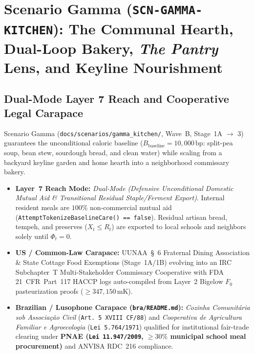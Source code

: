 \chapter{Scenario Gamma (\texttt{SCN-GAMMA-KITCHEN}): The Communal Hearth, Dual-Loop Bakery, \textit{The Pantry} Lens, and Keyline Nourishment}
\label{app:scenario-gamma}

\section{Dual-Mode Layer 7 Reach and Cooperative Legal Carapace}
Scenario Gamma (\texttt{docs/scenarios/gamma\_kitchen/}, Wave~B, Stage~1A $\to$ 3) guarantees the unconditional caloric baseline ($B_{\mathrm{baseline}} = 10{,}000\,\mathrm{bp}$: split-pea soup, bean stew, sourdough bread, and clean water) while scaling from a backyard keyline garden and home hearth into a neighborhood commissary bakery.
\begin{itemize}
    \item \textbf{Layer~7 Reach Mode:} \textit{Dual-Mode (Defensive Unconditional Domestic Mutual Aid \& Transitional Residual Staple/Ferment Export)}. Internal resident meals are $100\%$ non-commercial mutual aid (\texttt{AttemptTokenizeBaselineCare() == false}). Residual artisan bread, tempeh, and preserves ($X_t \le R_t$) are exported to local schools and neighbors solely until $\Phi_t = 0$.
    \item \textbf{US / Common-Law Carapace:} UUNAA~\S~6 Fraternal Dining Association \& State Cottage Food Exemptions (Stage~1A/1B) evolving into an IRC Subchapter~T Multi-Stakeholder Commissary Cooperative with FDA 21~CFR~Part~117 HACCP logs auto-compiled from Layer~2 Bigelow $F_0$ pasteurization proofs ($\ge 347{,}150\,\mathrm{mK}$).
    \item \textbf{Brazilian / Lusophone Carapace (\texttt{bra/README.md}):} \textit{Cozinha Comunit{\'a}ria sob Associa{\c{c}}{\~a}o Civil} (\texttt{Art.~5{\textordmasculine} XVIII CF/88}) and \textit{Cooperativa de Agricultura Familiar e Agroecologia} (\texttt{Lei 5.764/1971}) qualified for institutional fair-trade clearing under \textbf{PNAE (\texttt{Lei 11.947/2009}, $\ge 30\%$ municipal school meal procurement)} and ANVISA RDC~216 compliance.
\end{itemize}


